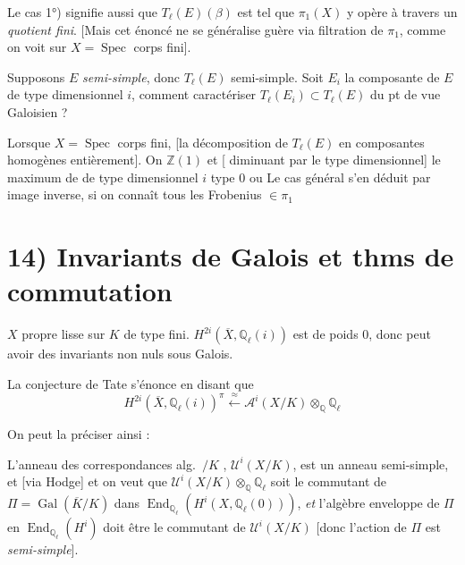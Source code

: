 \documentclass[11pt,a4paper]{article}
\begin{document}
Le cas 1°)  signifie aussi que $T_{\ell}(E)(\beta)$ est tel que $\pi_{1}(X)$ y opère à travers un \emph{quotient fini}. [Mais cet énoncé ne se généralise guère via filtration de $\pi_{1}$, comme on voit sur $X = \operatorname{Spec}$ corps fini].

Supposons $E$  \emph{semi-simple}, donc $T_{\ell}(E)$ semi-simple. Soit $E_{i}$ la composante de $E$ de type dimensionnel $i$, comment caractériser $T_{\ell}(E_{i}) \subset T_{\ell}(E)$ du pt de vue Galoisien ? 

Lorsque $X = \operatorname{Spec}$ corps fini, \ill{} [la décomposition de $T_{\ell}(E)$ en composantes homogènes \ill{} \ill{} \ill{} entièrement]. On \ill{} \ill{} \ill{} \ill{} $\mathbb{Z}(1)$ et [\ill{} diminuant par le type dimensionnel] \ill{} le maximum de \ill{} de type dimensionnel $i$ \ill{} type $0$ ou \ill{} \ill{} \ill{} Le cas général s'en déduit par image inverse, si on connaît tous les Frobenius $\in \pi_{1}$

\section{14) Invariants de Galois et thms de commutation}

$X$ propre lisse sur $K$ de type fini. $H^{2i}(\overline{X}, \mathbb{Q}_{\ell}(i))$ est de poids $0$, donc peut avoir des invariants non nuls sous Galois.

La conjecture de Tate s'énonce en disant que
\[
  H^{2i}(\overline{X}, \mathbb{Q}_{\ell}(i))^{\pi} \xleftarrow{\ \approx\ } \mathcal{A}^{i}(X/K) \otimes_{\mathbb{Q}} \mathbb{Q}_{\ell}
\]

On peut la préciser ainsi :

L'anneau des correspondances alg.\ $/K$ , \struck{\ill{}} $\mathcal{U}^{i}(X/K)$, est un anneau semi-simple, et [via Hodge] et on veut que $\mathcal{U}^{i}(X/K) \otimes_{\mathbb{Q}} \mathbb{Q}_{\ell}$ soit le commutant de $\Pi = \operatorname{Gal}(\overline{K}/K)$ dans $\operatorname{End}_{\mathbb{Q}_{\ell}}(H^{i}(X, \mathbb{Q}_{\ell}(0)))$, \emph{et} l'algèbre enveloppe de $\Pi$ en $\operatorname{End}_{\mathbb{Q}_{\ell}}(H^{i})$ doit être le commutant de $\mathcal{U}^{i}(X/K)$ [donc l'action de $\Pi$ est \emph{semi-simple}].
\end{document}
